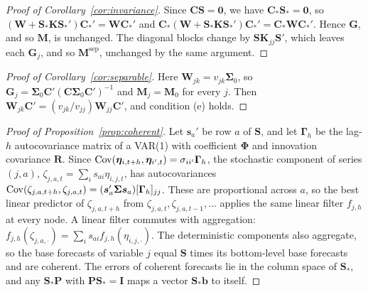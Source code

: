\begin{proof}[Proof of Corollary~\ref{cor:invariance}]
Since $\bm{C}\bm{S} = \bm{0}$, we have $\bm{C}_*\bm{S}_* = \bm{0}$, so $(\bm{W} + \bm{S}_*\bm{K}\bm{S}_*')\bm{C}_*' = \bm{W}\bm{C}_*'$ and $\bm{C}_*(\bm{W} + \bm{S}_*\bm{K}\bm{S}_*')\bm{C}_*' = \bm{C}_*\bm{W}\bm{C}_*'$. Hence $\bm{G}$, and so $\bm{M}$, is unchanged. The diagonal blocks change by $\bm{S}\bm{K}_{jj}\bm{S}'$, which leaves each $\bm{G}_j$, and so $\bm{M}^{\mathrm{sep}}$, unchanged by the same argument.
\end{proof}

\begin{proof}[Proof of Corollary~\ref{cor:separable}]
Here $\bm{W}_{jk} = v_{jk}\bm{\Sigma}_0$, so $\bm{G}_j = \bm{\Sigma}_0\bm{C}'(\bm{C}\bm{\Sigma}_0\bm{C}')^{-1}$ and $\bm{M}_j = \bm{M}_0$ for every $j$. Then $\bm{W}_{jk}\bm{C}' = (v_{jk}/v_{jj})\bm{W}_{jj}\bm{C}'$, and condition (e) holds.
\end{proof}

\begin{proof}[Proof of Proposition~\ref{prop:coherent}]
Let $\bm{s}_a'$ be row $a$ of $\bm{S}$, and let $\bm{\Gamma}_h$ be the lag-$h$ autocovariance matrix of a VAR(1) with coefficient $\bm{\Phi}$ and innovation covariance $\bm{R}$. Since $\operatorname{Cov}(\bm{\eta}_{i,t+h}, \bm{\eta}_{i',t}) = \sigma_{ii'}\bm{\Gamma}_h$, the stochastic component of series $(j,a)$, $\zeta_{j,a,t} = \sum_i s_{ai}\eta_{i,j,t}$, has autocovariances $\operatorname{Cov}(\zeta_{j,a,t+h}, \zeta_{j,a,t}) = (\bm{s}_a'\bm{\Sigma}\bm{s}_a)[\bm{\Gamma}_h]_{jj}$. These are proportional across $a$, so the best linear predictor of $\zeta_{j,a,t+h}$ from $\zeta_{j,a,t}, \zeta_{j,a,t-1}, \dots$ applies the same linear filter $f_{j,h}$ at every node. A linear filter commutes with aggregation: $f_{j,h}(\zeta_{j,a,\cdot}) = \sum_i s_{ai} f_{j,h}(\eta_{i,j,\cdot})$. The deterministic components also aggregate, so the base forecasts of variable $j$ equal $\bm{S}$ times its bottom-level base forecasts and are coherent. The errors of coherent forecasts lie in the column space of $\bm{S}_*$, and any $\bm{S}_*\bm{P}$ with $\bm{P}\bm{S}_* = \bm{I}$ maps a vector $\bm{S}_*\bm{b}$ to itself.
\end{proof}
